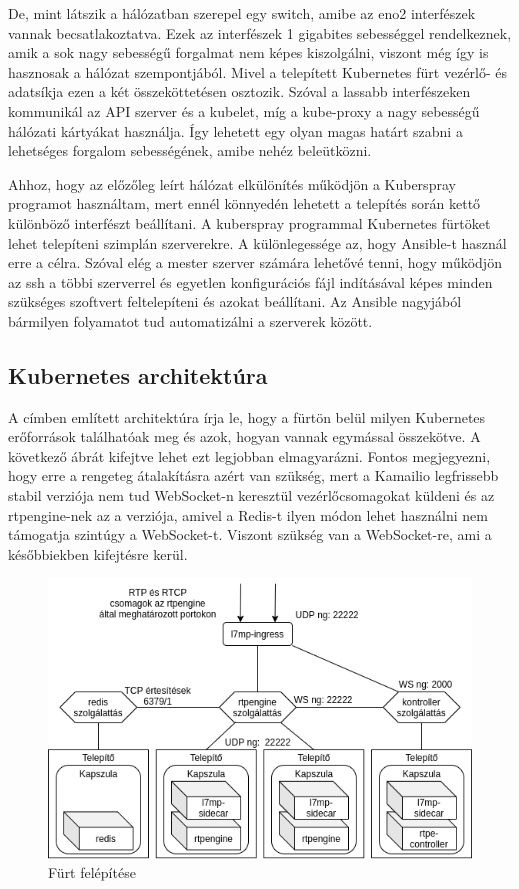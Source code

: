 De, mint látszik a hálózatban szerepel egy switch, amibe az eno2 interfészek vannak
becsatlakoztatva. Ezek az interfészek 1 gigabites sebességgel rendelkeznek, amik
a sok nagy sebességű forgalmat nem képes kiszolgálni, viszont még így is hasznosak
a hálózat szempontjából. Mivel a telepített Kubernetes fürt vezérlő- és adatsíkja
ezen a két összeköttetésen osztozik. Szóval a lassabb interfészeken kommunikál az
API szerver és a kubelet, míg a kube-proxy a nagy sebességű hálózati kártyákat 
használja. Így lehetett egy olyan magas határt szabni a lehetséges forgalom
sebességének, amibe nehéz beleütközni. 

Ahhoz, hogy az előzőleg leírt hálózat elkülönítés működjön a Kuberspray programot 
használtam, mert ennél könnyedén lehetett a telepítés során kettő különböző interfészt
beállítani. A kuberspray \cite{kubespray} programmal Kubernetes fürtöket lehet telepíteni szimplán
szerverekre. A különlegessége az, hogy Ansible-t használ erre a célra. Szóval elég
a mester szerver számára lehetővé tenni, hogy működjön az ssh a többi szerverrel és
egyetlen konfigurációs fájl indításával képes minden szükséges szoftvert feltelepíteni
és azokat beállítani. Az Ansible \cite{ansible} nagyjából bármilyen folyamatot tud automatizálni a
szerverek között. 

\subsection{Kubernetes architektúra}

A címben említett architektúra írja le, hogy a fürtön belül milyen Kubernetes
erőforrások találhatóak meg és azok, hogyan vannak egymással összekötve. A következő
ábrát kifejtve lehet ezt legjobban elmagyarázni. Fontos megjegyezni, hogy erre 
a rengeteg átalakításra azért van szükség, mert a Kamailio legfrissebb
stabil verziója nem tud WebSocket-n keresztül vezérlőcsomagokat küldeni és az rtpengine-nek
az a verziója, amivel a Redis-t ilyen módon lehet használni nem támogatja szintúgy
a WebSocket-t. Viszont szükség van a WebSocket-re, ami a későbbiekben kifejtésre kerül.

\begin{figure}[!ht]
	\centering
	\includegraphics[width=1\textwidth, keepaspectratio]{figures/cluster.png}
	\caption{Fürt felépítése}
	\label{fig:HVSpaces}
\end{figure}

